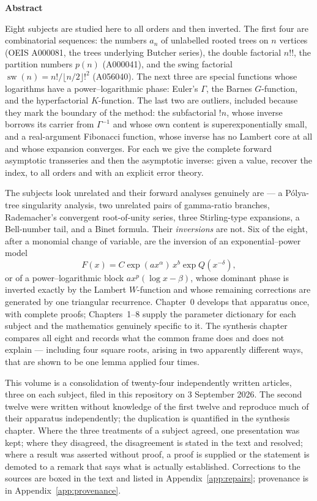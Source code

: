\documentclass[11pt,a4paper,oneside]{book}
\theoremstyle{plain}
\theoremstyle{definition}
\theoremstyle{remark}
\providecommand{\abstractname}{Abstract}
\newenvironment{abstract}%
  {\begin{center}\bfseries\abstractname\end{center}%
   \begin{list}{}{\setlength{\leftmargin}{2em}\setlength{\rightmargin}{2em}}%
   \item[]\small}%
  {\end{list}}
\begin{document}
\begin{abstract}
Eight subjects are studied here to all orders and then inverted.  The
first four are combinatorial sequences: the numbers \(a_n\) of unlabelled rooted trees on \(n\) vertices
(OEIS A000081, the trees underlying Butcher series), the double factorial
\(n!!\), the partition numbers \(p(n)\) (A000041), and the swing factorial
\(\operatorname{sw}(n)=n!/\lfloor n/2\rfloor!^{2}\) (A056040).  The next three are special
functions whose logarithms have a power--logarithmic phase: Euler's
\(\Gamma\), the Barnes \(G\)-function, and the hyperfactorial
\(K\)-function.  The last two are outliers, included because they mark the
boundary of the method: the subfactorial \(!n\), whose inverse borrows its
carrier from \(\Gamma^{-1}\) and whose own content is superexponentially
small, and a real-argument Fibonacci function, whose inverse has no Lambert
core at all and whose expansion converges.  For each we give the complete
forward asymptotic transseries and then the asymptotic inverse: given a
value, recover the index, to all orders and with an explicit error theory.

The subjects look unrelated and their forward analyses genuinely are --- a
Pólya-tree singularity analysis, two unrelated pairs of gamma-ratio branches,
Rademacher's convergent root-of-unity series, three Stirling-type expansions,
a Bell-number tail, and a Binet formula.  Their \emph{inversions} are not.
Six of the eight, after a monomial change of variable, are the inversion of
an exponential--power model
\[
  F(x)=C\exp(ax^{\alpha})\,x^{b}\exp Q(x^{-\delta}),
\]
or of a power--logarithmic block \(a x^{p}(\log x-\beta)\), whose dominant
phase is inverted exactly by the Lambert \(W\)-function and whose remaining
corrections are generated by one triangular recurrence.  Chapter~0 develops
that apparatus once, with complete proofs; Chapters~1--8 supply the parameter
dictionary for each subject and the mathematics genuinely specific to it.  The
synthesis chapter compares all eight and records what the common frame does
and does not explain --- including four square roots, arising in two
apparently different ways, that are shown to be one lemma applied four
times.

This volume is a consolidation of twenty-four independently written
articles, three on each subject, filed in this repository on 3 September
2026.  The second twelve were written without knowledge of the first twelve
and reproduce much of their apparatus independently; the duplication is
quantified in the synthesis chapter.  Where
the three treatments of a subject agreed, one presentation was kept; where
they disagreed, the disagreement is stated in the text and resolved; where a
result was asserted without proof, a proof is supplied or the statement is
demoted to a remark that says what is actually established.  Corrections to
the sources are boxed in the text and listed in
Appendix~\ref{app:repairs}; provenance is in Appendix~\ref{app:provenance}.
\end{abstract}
\end{document}
